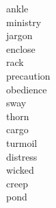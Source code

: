 \documentclass[b5paper, 11pt]{ctexart}
\begin{document}
\begin{multicols*}{3}
\begin{description}
\item[ankle]

\item[ministry]

\item[jargon]

\item[enclose]

\item[rack]

\item[precaution]

\item[obedience]

\item[sway]

\item[thorn]

\item[cargo]

\item[turmoil]

\item[distress]

\item[wicked]

\item[creep]

\item[pond]

    \end{description}
\end{multicols*}
\end{document}
